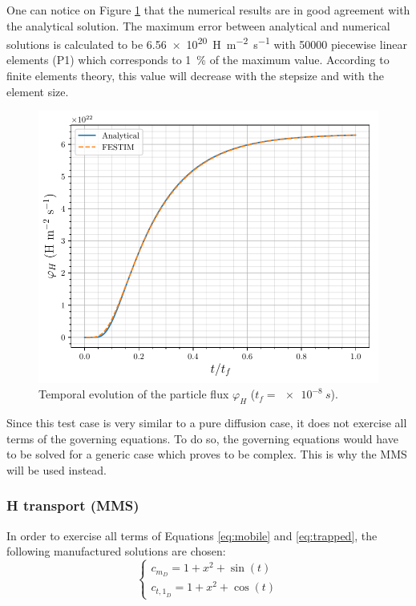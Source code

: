 One can notice on Figure \ref{fig:FESTIM vs analytical} that the numerical results are in good agreement with the analytical solution.
The maximum error between analytical and numerical solutions is calculated to be \SI{6.56e20}{H.m^{-2}.s^{-1}} with 50000 piecewise linear elements (P1) which corresponds to \SI{1}{\%} of the maximum value.
According to finite elements theory, this value will decrease with the stepsize and with the element size.
\begin{figure}
    \centering
    \includegraphics[width=\linewidth]{Figures/Chapter3/FESTIM_vs_analytical.pdf}
    \caption{Temporal evolution of the particle flux $\varphi_H$ ($t_f = \SI{e-8}{s}$).}
    \label{fig:FESTIM vs analytical}
\end{figure}

Since this test case is very similar to a pure diffusion case, it does not exercise all terms of the governing equations.
To do so, the governing equations would have to be solved for a generic case which proves to be complex.
This is why the MMS will be used instead.

\subsubsection{H transport (MMS)} \label{mms}

In order to exercise all terms of Equations \ref{eq:mobile} and \ref{eq:trapped}, the following manufactured solutions are chosen:
\begin{equation}
    \begin{cases}
    c_{m_D} = 1 + x^2 + \sin(t) \\
    c_{{t,1}_D} = 1 + x^2 + \cos(t)
    \end{cases}
    \label{eq: manufactured solutions}
\end{equation}

